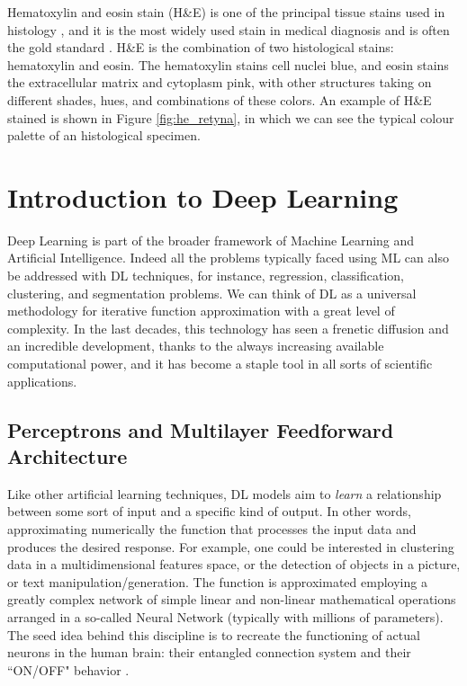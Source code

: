\documentclass[12pt,a4paper]{report}
\begin{document}
Hematoxylin and eosin stain (H\&E) is one of the principal tissue stains used in histology \cite{he_stain}, and it is the most widely used stain in medical diagnosis and is often the gold standard \cite{Rosai2007}. H\&E is the combination of two histological stains: hematoxylin and eosin. The hematoxylin stains cell nuclei blue, and eosin stains the extracellular matrix and cytoplasm pink, with other structures taking on different shades, hues, and combinations of these colors. An example of H\&E stained is shown in Figure \ref{fig:he_retyna}, in which we can see the typical colour palette of an histological specimen.

        \clearpage
        \section{Introduction to Deep Learning} \label{ssec:DL}
Deep Learning is part of the broader framework of Machine Learning and Artificial Intelligence. Indeed all the problems typically faced using ML can also be addressed with DL techniques, for instance, regression, classification, clustering, and segmentation problems. We can think of DL as a universal methodology for iterative function approximation with a great level of complexity. In the last decades, this technology has seen a frenetic diffusion and an incredible development, thanks to the always increasing available computational power, and it has become a staple tool in all sorts of scientific applications.

\subsection{Perceptrons and Multilayer Feedforward Architecture}
Like other artificial learning techniques, DL models aim to \textit{learn} a relationship between some sort of input and a specific kind of output. In other words,  approximating numerically the function that processes the input data and produces the desired response. For example, one could be interested in clustering data in a multidimensional features space, or the detection of objects in a picture, or text manipulation/generation. The function is approximated employing a greatly complex network of simple linear and non-linear mathematical operations arranged in a so-called Neural Network (typically with millions of parameters). The seed idea behind this discipline is to recreate the functioning of actual neurons in the human brain: their entangled connection system and their ``ON/OFF" behavior \cite{10.5555/3275328}.
\end{document}
